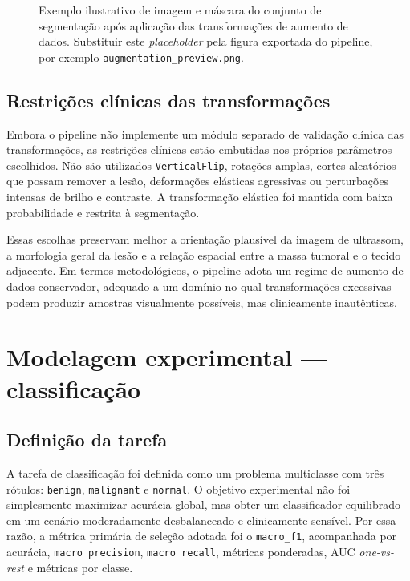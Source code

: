 \documentclass[tcc,capa]{texufpel}
\begin{document}
\begin{figure}[htbp]
	\centering
	\fbox{\rule{0pt}{5cm}\rule{0.9\textwidth}{0pt}}
	\caption{Exemplo ilustrativo de imagem e máscara do conjunto de segmentação após aplicação das transformações de aumento de dados. Substituir este \textit{placeholder} pela figura exportada do pipeline, por exemplo \texttt{augmentation\_preview.png}.}
	\label{fig:augmentation_segmentation_placeholder}
\end{figure}

\subsection{Restrições clínicas das transformações}

Embora o pipeline não implemente um módulo separado de validação clínica das transformações, as restrições clínicas estão embutidas nos próprios parâmetros escolhidos. Não são utilizados \texttt{VerticalFlip}, rotações amplas, cortes aleatórios que possam remover a lesão, deformações elásticas agressivas ou perturbações intensas de brilho e contraste. A transformação elástica foi mantida com baixa probabilidade e restrita à segmentação.

Essas escolhas preservam melhor a orientação plausível da imagem de ultrassom, a morfologia geral da lesão e a relação espacial entre a massa tumoral e o tecido adjacente. Em termos metodológicos, o pipeline adota um regime de aumento de dados conservador, adequado a um domínio no qual transformações excessivas podem produzir amostras visualmente possíveis, mas clinicamente inautênticas.

\section{Modelagem experimental --- classificação}

\subsection{Definição da tarefa}

A tarefa de classificação foi definida como um problema multiclasse com três rótulos: \texttt{benign}, \texttt{malignant} e \texttt{normal}. O objetivo experimental não foi simplesmente maximizar acurácia global, mas obter um classificador equilibrado em um cenário moderadamente desbalanceado e clinicamente sensível. Por essa razão, a métrica primária de seleção adotada foi o \texttt{macro\_f1}, acompanhada por acurácia, \texttt{macro precision}, \texttt{macro recall}, métricas ponderadas, AUC \textit{one-vs-rest} e métricas por classe.
\end{document}
